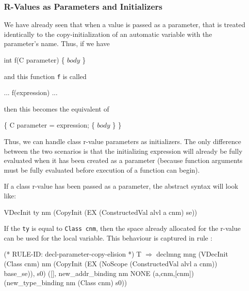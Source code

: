 \documentclass[11pt]{article}
\begin{document}
\subsubsection{R-Values as Parameters and Initializers}
\label{sec:rvalues-as-parameters}

We have already seen that when a value is passed as a parameter, that
is treated identically to the copy-initialization of an automatic
variable with the parameter's name.  Thus, if we have
\begin{stdrule}
   int f(C parameter) \{ \(\mathit{body}\) \}
\end{stdrule}
and this function \texttt{f} is called
\begin{stdrule}
   ... f(expression) ...
\end{stdrule}
then this becomes the equivalent of
\begin{stdrule}
   \{
     C parameter = expression;
     \{
       \(\mathit{body}\)
     \}
   \}
\end{stdrule}
Thus, we can handle class r-value parameters as initializers.  The
only difference between the two scenarios is that the initializing
expression will already be fully evaluated when it has been created as
a parameter (because function arguments must be fully evaluated before
execution of a function can begin).

If a class r-value has been passed as a parameter, the abstract syntax
will look like:
\begin{stdrule}
   VDecInit ty nm (CopyInit (EX (ConstructedVal alvl a cnm) se))
\end{stdrule}
If the \texttt{ty} is equal to \texttt{Class~cnm}, then the space
already allocated for the r-value can be used for the local variable.
This behaviour is captured in rule
:%
%
\begin{stdrule}
(* RULE-ID: decl-parameter-copy-elision *)
     T
   \(\Rightarrow\)
     declmng mng
       (VDecInit (Class cnm) nm
          (CopyInit (EX (NoScope (ConstructedVal alvl a cnm))
                     base_se)),
        s0)
       ([], new_addr_binding nm NONE (a,cnm,[cnm])
              (new_type_binding nm (Class cnm) s0))
\end{stdrule}
\end{document}
